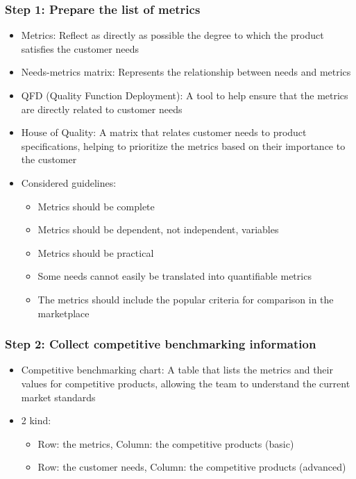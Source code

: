 \documentclass[a4paper,12pt,openany]{book}
\begin{document}
\subsubsection{Step 1: Prepare the list of metrics}
\begin{itemize}
    \item Metrics: Reflect as directly as possible the degree to which the product satisfies the customer needs
    \item Needs-metrics matrix: Represents the relationship between needs and metrics
    \item QFD (Quality Function Deployment): A tool to help ensure that the metrics are directly related to customer needs
    \item House of Quality: A matrix that relates customer needs to product specifications, helping to prioritize the metrics based on their importance to the customer
    \item Considered guidelines:
    \begin{itemize}
        \item Metrics should be complete
        \item Metrics should be dependent, not independent, variables
        \item Metrics should be practical
        \item Some needs cannot easily be translated into quantifiable metrics
        \item The metrics should include the popular criteria for comparison in the marketplace
    \end{itemize}
\end{itemize}
\subsubsection{Step 2: Collect competitive benchmarking information}
\begin{itemize}
    \item Competitive benchmarking chart: A table that lists the metrics and their values for competitive products, allowing the team to understand the current market standards
    \item 2 kind:
    \begin{itemize}
        \item Row: the metrics, Column: the competitive products (basic)
        \item Row: the customer needs, Column: the competitive products (advanced)
    \end{itemize}
\end{itemize}
\end{document}
